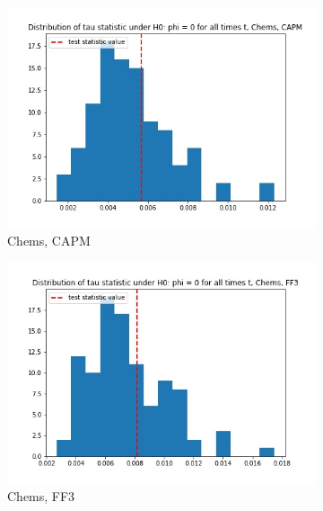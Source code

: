 \documentclass{article}
\begin{document}
    \begin{figure}
    \centering
  \begin{subfigure}[b]{0.3\textwidth}
    \centering
    \includegraphics[width=\textwidth]{Chems/tau_hist_02_CAPM.jpg}
    \caption{Chems, CAPM}
    \label{fig:1}
  \end{subfigure}
  \begin{subfigure}[b]{0.3\textwidth}
    \centering
    \includegraphics[width=\textwidth]{Chems/tau_hist_02_FF3.jpg}
    \caption{Chems, FF3}
    \label{fig:2}
  \end{subfigure}
    \begin{subfigure}[b]{0.3\textwidth}
    \centering

\end{subfigure}
\end{figure}
\end{document}
